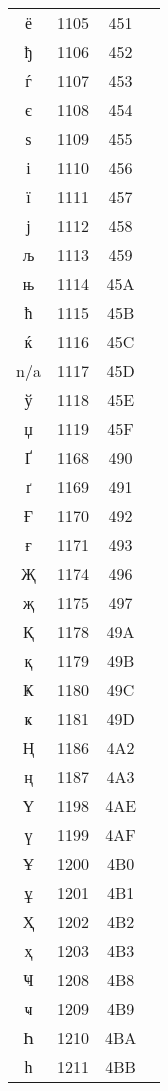 \documentclass[10pt]{article}
\begin{document}
\begin{tabular}{crcl}
ё&1105&451&\\
ђ&1106&452&\\
ѓ&1107&453&\\
є&1108&454&\\
ѕ&1109&455&\\
і&1110&456&\\
ї&1111&457&\\
ј&1112&458&\\
љ&1113&459&\\
њ&1114&45A&\\
ћ&1115&45B&\\
ќ&1116&45C&\\
n/a&1117&45D&\\
ў&1118&45E&\\
џ&1119&45F&\\
Ґ&1168&490&\\
ґ&1169&491&\\
Ғ&1170&492&\\
ғ&1171&493&\\
Җ&1174&496&\\
җ&1175&497&\\
Қ&1178&49A&\\
қ&1179&49B&\\
Ҝ&1180&49C&\\
ҝ&1181&49D&\\
Ң&1186&4A2&\\
ң&1187&4A3&\\
Ү&1198&4AE&\\
ү&1199&4AF&\\
Ұ&1200&4B0&\\
ұ&1201&4B1&\\
Ҳ&1202&4B2&\\
ҳ&1203&4B3&\\
Ҹ&1208&4B8&\\
ҹ&1209&4B9&\\
Һ&1210&4BA&\\
һ&1211&4BB&\\
\end{tabular}
\end{document}
